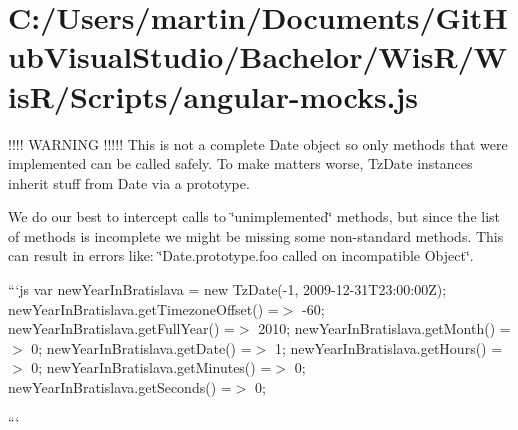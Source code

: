 \hypertarget{_c_1_2_users_2martin_2_documents_2_git_hub_visual_studio_2_bachelor_2_wis_r_2_wis_r_2_scripts_2angular-mocks_8js-example}{}\section{C\+:/\+Users/martin/\+Documents/\+Git\+Hub\+Visual\+Studio/\+Bachelor/\+Wis\+R/\+Wis\+R/\+Scripts/angular-\/mocks.\+js}
!!!! W\+A\+R\+N\+I\+N\+G !!!!! This is not a complete Date object so only methods that were implemented can be called safely. To make matters worse, Tz\+Date instances inherit stuff from Date via a prototype.

We do our best to intercept calls to \char`\"{}unimplemented\char`\"{} methods, but since the list of methods is incomplete we might be missing some non-\/standard methods. This can result in errors like\+: \char`\"{}\+Date.\+prototype.\+foo called on incompatible Object\char`\"{}.


\begin{DoxyItemize}
\item ```js var new\+Year\+In\+Bratislava = new Tz\+Date(-\/1, \textquotesingle{}2009-\/12-\/31\+T23\+:00\+:00\+Z\textquotesingle{}); new\+Year\+In\+Bratislava.\+get\+Timezone\+Offset() =$>$ -\/60; new\+Year\+In\+Bratislava.\+get\+Full\+Year() =$>$ 2010; new\+Year\+In\+Bratislava.\+get\+Month() =$>$ 0; new\+Year\+In\+Bratislava.\+get\+Date() =$>$ 1; new\+Year\+In\+Bratislava.\+get\+Hours() =$>$ 0; new\+Year\+In\+Bratislava.\+get\+Minutes() =$>$ 0; new\+Year\+In\+Bratislava.\+get\+Seconds() =$>$ 0;
\item ```
\end{DoxyItemize}



